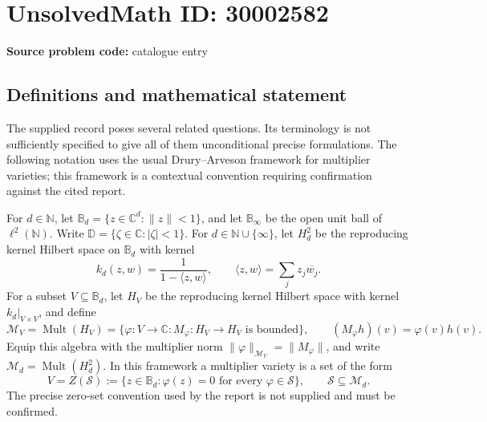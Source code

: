 \documentclass[11pt]{article}
\newcommand{\N}{\mathbb{N}}
\newcommand{\C}{\mathbb{C}}
\begin{document}
\section*{UnsolvedMath ID: 30002582}
\textbf{Source problem code:} catalogue entry
\subsection{Definitions and mathematical statement}
The supplied record poses several related questions. Its terminology is not sufficiently specified to give all of them unconditional precise formulations. The following notation uses the usual Drury--Arveson framework for multiplier varieties; this framework is a contextual convention requiring confirmation against the cited report.

For \(d\in\N\), let \(\mathbb B_d=\{z\in\C^d:\|z\|<1\}\), and let \(\mathbb B_\infty\) be the open unit ball of \(\ell^2(\N)\). Write \(\mathbb D=\{\zeta\in\C:|\zeta|<1\}\). For \(d\in\N\cup\{\infty\}\), let \(H_d^2\) be the reproducing kernel Hilbert space on \(\mathbb B_d\) with kernel
\[
 k_d(z,w)=\frac{1}{1-\langle z,w\rangle},
 \qquad \langle z,w\rangle=\sum_j z_j\overline{w_j}.
\]
For a subset \(V\subseteq\mathbb B_d\), let \(H_V\) be the reproducing kernel Hilbert space with kernel \(k_d|_{V\times V}\), and define
\[
 \mathcal M_V=\operatorname{Mult}(H_V)
 =\{\varphi:V\to\C: M_\varphi:H_V\to H_V\text{ is bounded}\},
 \qquad (M_\varphi h)(v)=\varphi(v)h(v).
\]
Equip this algebra with the multiplier norm \(\|\varphi\|_{\mathcal M_V}=\|M_\varphi\|\), and write \(\mathcal M_d=\operatorname{Mult}(H_d^2)\). In this framework a multiplier variety is a set of the form
\[
 V=Z(\mathcal S)
 :=\{z\in\mathbb B_d:\varphi(z)=0\text{ for every }\varphi\in\mathcal S\},
 \qquad \mathcal S\subseteq\mathcal M_d.
\]
The precise zero-set convention used by the report is not supplied and must be confirmed.
\end{document}
